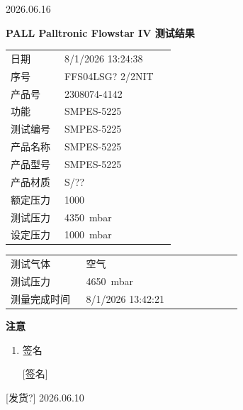 \documentclass[UTF8,10pt,a4paper,fontset=fandol]{ctexart}
\newcommand{\fieldvalue}[1]{#1}
\newcommand{\handwritten}[1]{#1}
\begin{document}
\handwritten{2026.06.16}

\newpage

\noindent
\begin{minipage}[t]{0.47\linewidth}
\centering
\textbf{PALL Palltronic Flowstar IV 测试结果}

\medskip
\begin{tabular}{@{}p{0.30\linewidth}p{0.62\linewidth}@{}}
日期 &
\fieldvalue{8/1/2026 13:24:38}
\\[2pt]
序号 &
\fieldvalue{FFS04LSG? 2/2NIT}
\\[2pt]
产品号 &
\fieldvalue{2308074-4142}
\\[2pt]
功能 &
\fieldvalue{SMPES-5225}
\\[2pt]
测试编号 &
\fieldvalue{SMPES-5225}
\\[2pt]
产品名称 &
\fieldvalue{SMPES-5225}
\\[2pt]
产品型号 &
\fieldvalue{SMPES-5225}
\\[2pt]
产品材质 &
\fieldvalue{S/??}
\\[2pt]
额定压力 &
\fieldvalue{1000}
\\[2pt]
测试压力 &
\fieldvalue{4350\ mbar}
\\[2pt]
设定压力 &
\fieldvalue{1000\ mbar}
\end{tabular}

\medskip
\begin{tabular}{@{}p{0.30\linewidth}p{0.62\linewidth}@{}}
测试气体 &
\fieldvalue{空气}
\\[2pt]
测试压力 &
\fieldvalue{4650\ mbar}
\\[2pt]
测量完成时间 &
\fieldvalue{8/1/2026 13:42:21}
\end{tabular}

\medskip
\textbf{注意}

\begin{enumerate}
\item 签名

\fieldvalue{\handwritten{[签名]}}
\end{enumerate}

\fieldvalue{\handwritten{[发货?] 2026.06.10}}
\end{minipage}
\end{document}

